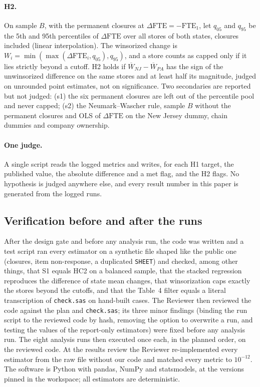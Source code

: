 \documentclass[11pt]{article}
\newcommand{\var}[1]{\texttt{#1}}
\begin{document}
\paragraph{H2.} On sample $B$, with the permanent closures at $\Delta\text{FTE} =
-\text{FTE}_1$, let $q_{05}$ and $q_{95}$ be the 5th and 95th percentiles of
$\Delta\text{FTE}$ over all stores of both states, closures included (linear
interpolation). The winsorized change is $W_i = \min(\max(\Delta\text{FTE}_i, q_{05}),
q_{95})$, and a store counts as capped only if it lies strictly beyond a cutoff. H2 holds if
$\overline W_{NJ} - \overline W_{PA}$ has the sign of the unwinsorized difference on the
same stores and at least half its magnitude, judged on unrounded point estimates, not on
significance. Two secondaries are reported but not judged: (s1) the six permanent closures
are left out of the percentile pool and never capped; (s2) the Neumark--Wascher rule,
sample $B$ without the permanent closures and OLS of $\Delta\text{FTE}$ on the New Jersey
dummy, chain dummies and company ownership.

\paragraph{One judge.} A single script reads the logged metrics and writes, for each H1
target, the published value, the absolute difference and a met flag, and the H2 flags. No
hypothesis is judged anywhere else, and every result number in this paper is generated from
the logged runs.

\subsection{Verification before and after the runs}

After the design gate and before any analysis run, the code was written and a test script
ran every estimator on a synthetic file shaped like
the public one (closures, item non-response, a duplicated \var{SHEET}) and checked, among
other things, that S1 equals HC2 on a balanced sample, that the stacked regression
reproduces the difference of state mean changes, that winsorization caps exactly the stores
beyond the cutoffs, and that the Table~4 filter equals a literal transcription of
\texttt{check.sas} on hand-built cases. The Reviewer then reviewed the code against the plan
and \texttt{check.sas}; its three minor findings (binding the run script to the reviewed
code by hash, removing the option to overwrite a run, and testing the values of the
report-only estimators) were fixed before any analysis run. The eight analysis runs then
executed once each, in the planned order, on the reviewed code. At the results review the
Reviewer re-implemented every estimator from the raw file without our code and matched every
metric to $10^{-12}$. The software is Python with pandas, NumPy and statsmodels, at the
versions pinned in the workspace; all estimators are deterministic.
\end{document}
